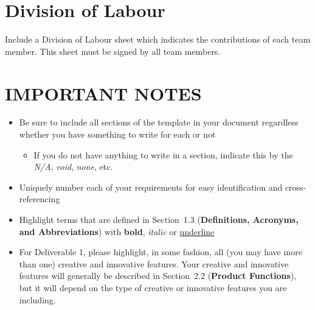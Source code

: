 \documentclass[]{article}
\begin{document}


\appendix
\section{Division of Labour}
\label{sec:division_of_labour}
Include a Division of Labour sheet which indicates the contributions of each 
team member. This sheet must be signed by all team members.

\newpage
\section*{IMPORTANT NOTES}
\begin{itemize}
	\item Be sure to include all sections of the template in your document 
regardless whether you have something to write for each or not
	\begin{itemize}
		\item If you do not have anything to write in a section, indicate this by the 
\emph{N/A}, \emph{void}, \emph{none}, etc.
	\end{itemize}
	\item Uniquely number each of your requirements for easy identification and 
cross-referencing
	\item Highlight terms that are defined in Section~1.3 (\textbf{Definitions, 
Acronyms, and Abbreviations}) with \textbf{bold}, \emph{italic} or 
\underline{underline}
	\item For Deliverable 1, please highlight, in some fashion, all (you may have 
more than one) creative and innovative features. Your creative and innovative 
features will generally be described in Section~2.2 (\textbf{Product 
Functions}), but it will depend on the type of creative or innovative features 
you are including.
\end{itemize}
\end{document}
